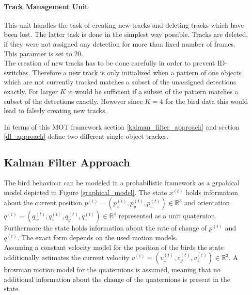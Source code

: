 \documentclass{article}
\begin{document}

\paragraph{Track Management Unit} This unit handles the task of creating new tracks and deleting tracks which have been lost. The latter task is done in the simplest way possible. Tracks are deleted, if they were not assigned any detection for more than fixed number of frames. This paramter is set to 20.\\ %
The creation of new tracks has to be done carefully in order to prevent ID-switches. Therefore a new track is only initialized when a pattern of one objects which are not currently tracked matches a subset of the unassigned detections exactly. For larger $K$ it would be sufficient if a subset of the pattern matches a subset of the detections exactly. However since $K=4$ for the bird data this would lead to falsely creating new tracks.


In terms of this MOT framework section \ref{kalman_filter_approach} and section \ref{dl_approach} define two different single object tracker.
 







\subsection{Kalman Filter Approach}

The bird behaviour can be modeled in a probabilistic framework as a grpahical model depicted in Figure \ref{graphical_model}. The state $x^{(t)}$ holds information about the current position $p^{(t)} = \left(p^{(t)}_x, p^{(t)}_y, p^{(t)}_z\right)\in \mathbb{R}^3$ and orientation $q^{(t)} = \left(q^{(t)}_w, q^{(t)}_x, q^{(t)}_y, q^{(t)}_z\right)\in \mathbb{R}^4$ represented as a unit quaternion. Furthermore the state holds information about the rate of change of $p^{(t)}$ and $q^{(t)}$. The exact form depends on the used motion models.\\
Assuming a constant velocity model for the position of the birds the state additionally estimates the current velocity $v^{(t)} = \left( v^{(t)}_x, v^{(t)}_y, v^{(t)}_z\right) \in \mathbb{R}^3$. A brownian motion model for the quaternions is assumed, meaning that no additional information about the change of the quaternions is present in the state.
\end{document}
